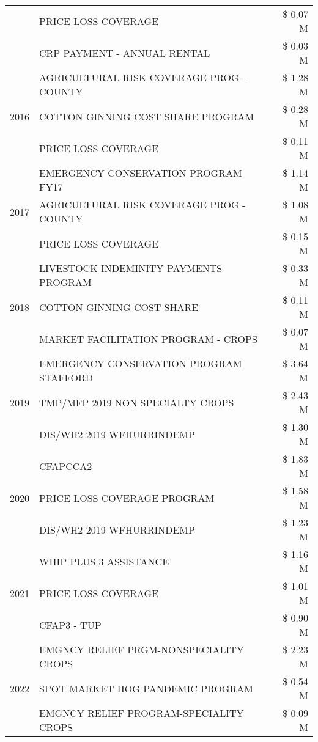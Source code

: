 \begin{tabular}{llr}
 & PRICE LOSS COVERAGE & \$ 0.07 M \\
 & CRP PAYMENT - ANNUAL RENTAL & \$ 0.03 M \\
\cline{1-3}
\multirow[t]{3}{*}{2016} & AGRICULTURAL RISK COVERAGE PROG - COUNTY & \$ 1.28 M \\
 & COTTON GINNING COST SHARE PROGRAM & \$ 0.28 M \\
 & PRICE LOSS COVERAGE & \$ 0.11 M \\
\cline{1-3}
\multirow[t]{3}{*}{2017} & EMERGENCY CONSERVATION PROGRAM FY17 & \$ 1.14 M \\
 & AGRICULTURAL RISK COVERAGE PROG - COUNTY & \$ 1.08 M \\
 & PRICE LOSS COVERAGE & \$ 0.15 M \\
\cline{1-3}
\multirow[t]{3}{*}{2018} & LIVESTOCK INDEMINITY PAYMENTS PROGRAM & \$ 0.33 M \\
 & COTTON GINNING COST SHARE & \$ 0.11 M \\
 & MARKET FACILITATION PROGRAM - CROPS & \$ 0.07 M \\
\cline{1-3}
\multirow[t]{3}{*}{2019} & EMERGENCY CONSERVATION PROGRAM STAFFORD & \$ 3.64 M \\
 & TMP/MFP 2019 NON SPECIALTY CROPS & \$ 2.43 M \\
 & DIS/WH2 2019 WFHURRINDEMP & \$ 1.30 M \\
\cline{1-3}
\multirow[t]{3}{*}{2020} & CFAPCCA2 & \$ 1.83 M \\
 & PRICE LOSS COVERAGE PROGRAM & \$ 1.58 M \\
 & DIS/WH2 2019 WFHURRINDEMP & \$ 1.23 M \\
\cline{1-3}
\multirow[t]{3}{*}{2021} & WHIP PLUS 3 ASSISTANCE & \$ 1.16 M \\
 & PRICE LOSS COVERAGE & \$ 1.01 M \\
 & CFAP3 - TUP & \$ 0.90 M \\
\cline{1-3}
\multirow[t]{3}{*}{2022} & EMGNCY RELIEF PRGM-NONSPECIALITY CROPS & \$ 2.23 M \\
 & SPOT MARKET HOG PANDEMIC PROGRAM & \$ 0.54 M \\
 & EMGNCY RELIEF PROGRAM-SPECIALITY CROPS & \$ 0.09 M \\
\cline{1-3}
\bottomrule
\end{tabular}
